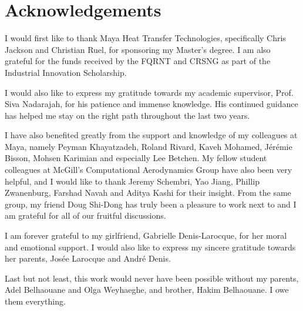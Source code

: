 \chapter*{Acknowledgements}
I would first like to thank Maya Heat Transfer Technologies, specifically Chris Jackson and Christian Ruel, for sponsoring my Master's degree. I am also grateful for the funds received by the FQRNT and CRSNG as part of the Industrial Innovation Scholarship.

I would also like to express my gratitude towards my academic supervisor, Prof. Siva Nadarajah, for his patience and immense knowledge. His continued guidance has helped me stay on the right path throughout the last two years. 

I have also benefited greatly from the support and knowledge of my colleagues at Maya, namely Peyman Khayatzadeh, Roland Rivard, Kaveh Mohamed, Jérémie Bisson, Mohsen Karimian and especially Lee Betchen. My fellow student colleagues at McGill's Computational Aerodynamics Group have also been very helpful, and I would like to thank Jeremy Schembri, Yao Jiang, Phillip Zwanenburg, Farshad Navah and Aditya Kashi for their insight. From the same group, my friend Doug Shi-Dong has truly been a pleasure to work next to and I am grateful for all of our fruitful discussions. 

I am forever grateful to my girlfriend, Gabrielle Denis-Larocque, for her moral and emotional support. I would also like to express my sincere gratitude towards her parents, Josée Larocque and André Denis.

Last but not least, this work would never have been possible without my parents, Adel Belhaouane and Olga Weyhaeghe, and brother, Hakim Belhaouane. I owe them everything. 
